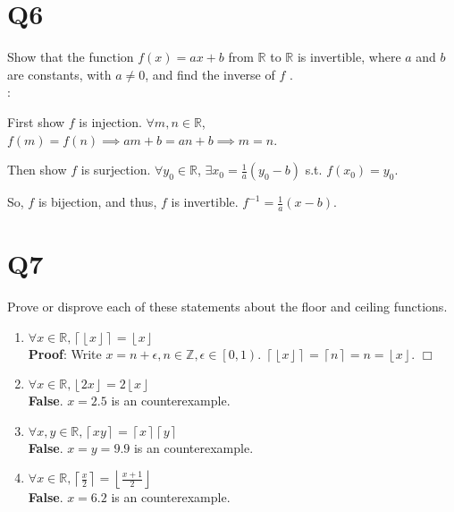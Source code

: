 \documentclass[11pt]{article}
\newenvironment{qparts}{\begin{enumerate}[{(}a{)}]}{\end{enumerate}}
\def\endproofmark{$\Box$}
\newenvironment{proof}{{\bf Proof}:}{\endproofmark\smallskip}
\newenvironment{solution}{{\bf Solution}:}{\smallskip}
\begin{document}
\section*{Q6}
Show that the function $ f (x) = ax + b$ from $\mathbb{R}$ to $\mathbb{R}$ is
invertible, where $a$ and $b$ are constants, with $a\neq 0$, and find
the inverse of $f$ .
\\
\begin{solution}

    First show $f$ is injection. $\forall m,n \in \mathbb{R}$,
    $f(m)=f(n) \implies  am+b=an+b \implies  m=n$.

    Then show  $f$ is surjection. $\forall y_0 \in \mathbb{R}$, $
    \exists x_0=\frac{1}{a}(y_0-b)$ s.t. $f(x_0)=y_0$.
    
    So, $f$ is bijection, and thus, $f$ is invertible. $f^{-1}=\frac{1}{a}(x-b)$.
\end{solution}

\section*{Q7}
Prove or disprove each of these statements about the ﬂoor and
ceiling functions.
\begin{qparts}
    
    \item $\forall x \in \mathbb{R}, \left\lceil \left\lfloor x \right\rfloor \right\rceil 
    =\left\lfloor x \right\rfloor $\\
    \begin{proof}
        Write $x=n+\epsilon, n \in \mathbb{Z}, \epsilon \in \left[ 0,1 \right)$.
        $\left\lceil \left\lfloor x \right\rfloor \right\rceil 
        =\left\lceil n \right\rceil 
        =n
        =\left\lfloor x \right\rfloor$.
    \end{proof}
    
    \item $\forall x \in \mathbb{R}, \left\lfloor 2x \right\rfloor =2\left\lfloor x \right\rfloor$\\
    \textbf{False}. $x=2.5$ is an counterexample.
    
    \item $\forall x,y \in \mathbb{R}, \left\lceil xy \right\rceil =\left\lceil x  \right\rceil \left\lceil y \right\rceil $\\
    \textbf{False}. $x=y=9.9$ is an counterexample.
    
    \item $\forall x \in \mathbb{R}, \left\lceil \frac{x}{2} \right\rceil =\left\lfloor \frac{x+1}{2} \right\rfloor$\\
    \textbf{False}. $x=6.2$ is an counterexample.
\end{qparts}
\end{document}
